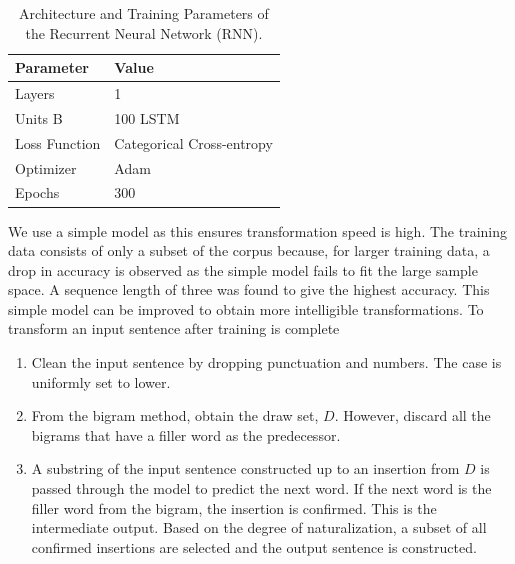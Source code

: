 \documentclass[journal]{IEEEtran}
\begin{document}
\begin{table}
\caption{Architecture and Training Parameters of the Recurrent Neural Network (RNN).}
\label{tab4}
\small
\setlength{\tabcolsep}{3pt}
\begin{tabular}{|p{116pt}|p{116pt}|}
\hline
Parameter& 
Value \\
\hline
Layers &  1 \\
Units B & 100 LSTM\cite{lstm} \\
Loss Function &  Categorical Cross-entropy\cite{cce} \\
Optimizer &  Adam\cite{adam} \\
Epochs & 300 \\
\hline
\end{tabular}
\label{tab4}
\end{table}

We use a simple model as this ensures transformation speed is high. The training data consists of only a subset of the corpus because, for larger training data, a drop in accuracy is observed as the simple model fails to fit the large sample space. A sequence length of three was found to give the highest accuracy. This simple model can be improved to obtain more intelligible transformations.
To transform an input sentence after training is complete

\begin{enumerate}
    \item Clean the input sentence by dropping punctuation and numbers. The case is uniformly set to lower.
    \item From the bigram method, obtain the draw set, $D$. However, discard all the bigrams that have a filler word as the predecessor.
    \item A substring of the input sentence constructed up to an insertion from $D$ is passed through the model to predict the next word. If the next word is the filler word from the bigram, the insertion is confirmed. This is the intermediate output. Based on the degree of naturalization, a subset of all confirmed insertions are selected and the output sentence is constructed.
\end{enumerate}
\end{document}
